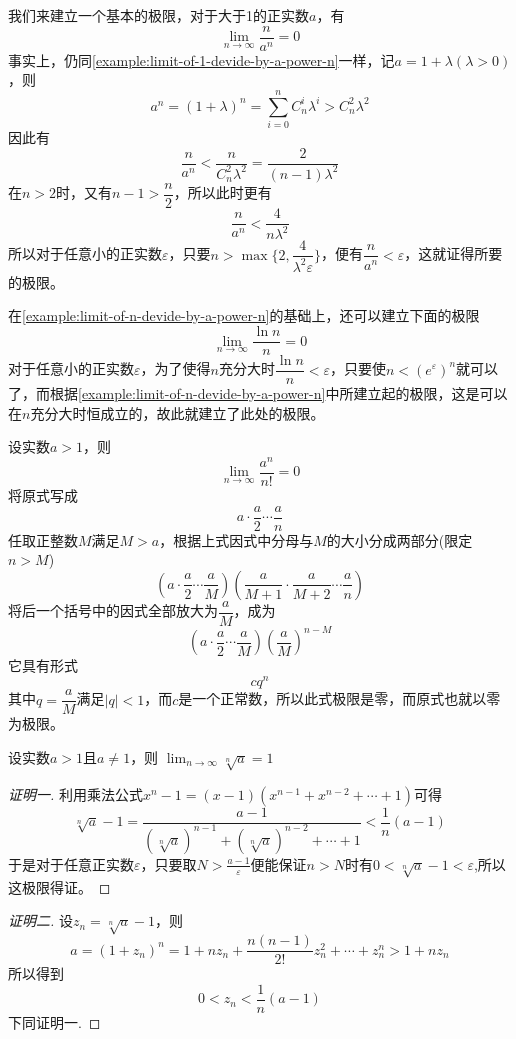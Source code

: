\begin{example}
  \label{example:limit-of-n-devide-by-a-power-n}
  我们来建立一个基本的极限，对于大于1的正实数$a$，有
  \[ \lim_{n \to \infty} \frac{n}{a^n} = 0 \]
  事实上，仍同\autoref{example:limit-of-1-devide-by-a-power-n}一样，记$a=1+\lambda(\lambda>0)$，则
  \[ a^n=(1+\lambda)^n=\sum_{i=0}^nC_n^i\lambda^i > C_n^2 \lambda^2 \]
  因此有
  \[ \frac{n}{a^n} < \frac{n}{C_n^2 \lambda^2} = \frac{2}{(n-1)\lambda^2} \]
  在$n>2$时，又有$n-1>\dfrac{n}{2}$，所以此时更有
  \[ \frac{n}{a^n} < \frac{4}{n\lambda^2} \]
  所以对于任意小的正实数$\varepsilon$，只要$n>\max\{2,\dfrac{4}{\lambda^2\varepsilon}\}$，便有$\dfrac{n}{a^n} < \varepsilon$，这就证得所要的极限。
\end{example}

\begin{example}
  \label{example:limit-of-lnn-devide-by-n}
  在\autoref{example:limit-of-n-devide-by-a-power-n}的基础上，还可以建立下面的极限
  \[ \lim_{n \to \infty} \frac{\ln{n}}{n} = 0 \]
  对于任意小的正实数$\varepsilon$，为了使得$n$充分大时$\dfrac{\ln{n}}{n} < \varepsilon$，只要使$n<(e^{\varepsilon})^n$就可以了，而根据\autoref{example:limit-of-n-devide-by-a-power-n}中所建立起的极限，这是可以在$n$充分大时恒成立的，故此就建立了此处的极限。
\end{example}

\begin{example}
  \label{example:limit-of-a-power-n-devide-by-n-fraction}
  设实数$a>1$，则
  \[ \lim_{n \to \infty} \frac{a^n}{n!} = 0 \]
  将原式写成
  \[ a \cdot \frac{a}{2} \cdots \frac{a}{n} \]
  任取正整数$M$满足$M>a$，根据上式因式中分母与$M$的大小分成两部分(限定$n>M$)
  \[ \left( a \cdot \frac{a}{2} \cdots \frac{a}{M} \right) \left( \frac{a}{M+1} \cdot \frac{a}{M+2} \cdots \frac{a}{n} \right) \]
  将后一个括号中的因式全部放大为$\dfrac{a}{M}$，成为
  \[ \left( a \cdot \frac{a}{2} \cdots \frac{a}{M} \right) \left( \frac{a}{M} \right)^{n-M} \]
  它具有形式
  \[ c q^n \]
  其中$q=\dfrac{a}{M}$满足$|q|<1$，而$c$是一个正常数，所以此式极限是零，而原式也就以零为极限。
\end{example}

\begin{example}
  \label{example:limit-of-n-sqrt-a-when-a-greater-than-1}
  设实数$a>1$且$a \neq 1$，则 $\lim_{n \to \infty} \sqrt[n]{a} = 1$

  \begin{proof}[证明一]
    利用乘法公式$x^n-1=(x-1)(x^{n-1}+x^{n-2}+\cdots+1)$可得
    \[ \sqrt[n]{a}-1 = \frac{a-1}{(\sqrt[n]{a})^{n-1}+(\sqrt[n]{a})^{n-2}+\cdots+1} < \frac{1}{n}(a-1) \]
   于是对于任意正实数$\varepsilon$，只要取$N>\frac{a-1}{\varepsilon}$便能保证$n>N$时有$0<\sqrt[n]{a}-1<\varepsilon$,所以这极限得证。
  \end{proof}

  \begin{proof}[证明二]
    设$z_n=\sqrt[n]{a}-1$，则
    \[ a = (1+z_n)^n = 1+ nz_n+\frac{n(n-1)}{2!}z_n^2+\cdots+z_n^n > 1+ n z_n \]
    所以得到
    \[ 0<z_n<\frac{1}{n}(a-1) \]
    下同证明一.
  \end{proof}
\end{example}


